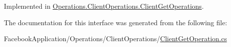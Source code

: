 Implemented in \hyperlink{class_operations_1_1_client_operations_1_1_client_get_operations_a1f9def392f80708b9a8b3aa2ac84c064}{Operations.\+Client\+Operations.\+Client\+Get\+Operations}.



The documentation for this interface was generated from the following file\+:\begin{DoxyCompactItemize}
\item 
Facebook\+Application/\+Operations/\+Client\+Operations/\hyperlink{_client_get_operation_8cs}{Client\+Get\+Operation.\+cs}\end{DoxyCompactItemize}
